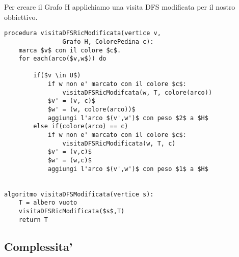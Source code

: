 \documentclass{article}
\begin{document}
Per creare il Grafo H applichiamo una visita DFS modificata per il nostro obbiettivo.
\begin{lstlisting}[mathescape=true]
procedura visitaDFSRicModificata(vertice v,
                Grafo H, ColorePedina c):
    marca $v$ con il colore $c$.
    for each(arco($v,w$)) do

        if($v \in U$)
            if w non e' marcato con il colore $c$:
                visitaDFSRicModifcata(w, T, colore(arco))
            $v' = (v, c)$
            $w' = (w, colore(arco))$
            aggiungi l'arco $(v',w')$ con peso $2$ a $H$ 
        else if(colore(arco) == c)
            if w non e' marcato con il colore $c$:
                visitaDFSRicModificata(w, T, c)
            $v' = (v,c)$
            $w' = (w,c)$
            aggiungi l'arco $(v',w')$ con peso $1$ a $H$


algoritmo visitaDFSModificata(vertice s):
    T = albero vuoto
    visitaDFSRicModificata($s$,T)
    return T
\end{lstlisting}

\subsection{Complessita'}
\end{document}
